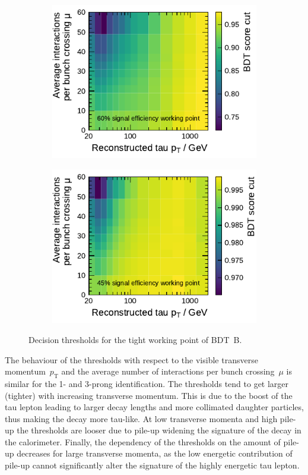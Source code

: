 \begin{figure}[htb]
  \centering
  \begin{subfigure}[t]{0.48\textwidth}
    \centering
    \includegraphics{./figures/bdt_perf/working_points/grid_1p_subsampling0269_wp.pdf}
  \end{subfigure}\hfill
  \begin{subfigure}[t]{0.48\textwidth}
    \centering
    \includegraphics{./figures/bdt_perf/working_points/grid_3p0327_wp.pdf}
  \end{subfigure}
  \caption{Decision thresholds for the tight working point of \mbox{BDT B}.}
  \label{fig:working_point_cutmap}
\end{figure}

The behaviour of the thresholds with respect to the visible transverse
momentum~$p_\text{T}$ and the average number of interactions per bunch
crossing~$\mu$ is similar for the 1- and 3-prong identification. The thresholds
tend to get larger (tighter) with increasing transverse momentum. This is due to
the boost of the tau lepton leading to larger decay lengths and more collimated
daughter particles, thus making the decay more tau-like. At low transverse
momenta and high pile-up the thresholds are looser due to pile-up widening the
signature of the decay in the calorimeter. Finally, the dependency of the
thresholds on the amount of pile-up decreases for large transverse momenta, as
the low energetic contribution of pile-up cannot significantly alter the
signature of the highly energetic tau lepton.

